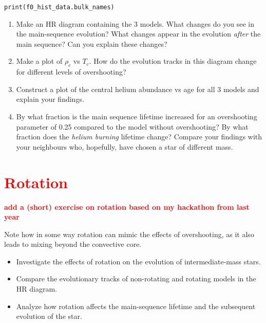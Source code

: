 \documentclass[11pt,a4paper]{article}
\newcommand{\todo}[1]{\textbf{\textcolor{red}{#1}}}
\begin{document}
\begin{enumerate}
\begin{lstlisting}[style=pythonstyle]
print(f0_hist_data.bulk_names)
\end{lstlisting}

\begin{enumerate}

  \item Make an HR diagram containing the 3 models. What changes do you see in the main-sequence evolution? What changes appear in the evolution \emph{after} the main sequence? Can you explain these changes?

  \item Make a plot of $\rho_c$ vs $T_c$. How do the evolution tracks in this diagram change for different levels of overshooting?

  \item Construct a plot of the central helium abundance vs age for all 3 models and explain your findings. 

  \item By what fraction is the main sequence lifetime increased for an overshooting parameter of 0.25 compared to the model without overshooting? By what fraction does the \emph{helium burning} lifetime change? Compare your findings with your neighbours who, hopefully, have chosen a star of different mass.

\end{enumerate}

\end{enumerate}


\section{\todo{Rotation}}
\todo{add a (short) exercise on rotation based on my hackathon from last year}

Note how in some way rotation can mimic the effects of overshooting, as it also leads to mixing beyond the convective core.

\begin{itemize}
    \item Investigate the effects of rotation on the evolution of intermediate-mass stars.
    \item Compare the evolutionary tracks of non-rotating and rotating models in the HR diagram.
    \item Analyze how rotation affects the main-sequence lifetime and the subsequent evolution of the star.
\end{itemize}



% 
% 
\end{document}
